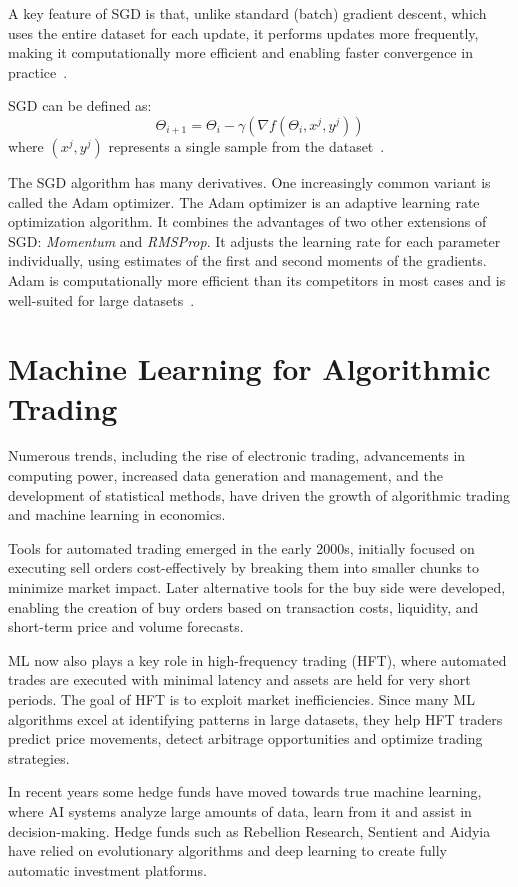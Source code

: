 \documentclass[a4paper,oneside,onecolumn,12pt]{book}
\begin{document}
		A key feature of SGD is that, unlike standard (batch) gradient descent, which uses the entire dataset for each update, it performs updates more frequently, making it computationally more efficient and enabling faster convergence in practice~\cite{COOTMLT}.

		SGD can be defined as:
		\[ \Theta_{i+1} = \Theta_{i} - \gamma (\nabla f(\Theta_i, x^j, y^j)) \]
		where $(x^j, y^j)$ represents a single sample from the dataset~\cite{SGD}.

		The SGD algorithm has many derivatives. One increasingly common variant is called the Adam optimizer. The Adam optimizer is an adaptive learning rate optimization algorithm. It combines the advantages of two other extensions of SGD: \textit{Momentum} and \textit{RMSProp}. It adjusts the learning rate for each parameter individually, using estimates of the first and second moments of the gradients. Adam is computationally more efficient than its competitors in most cases and is well-suited for large datasets~\cite{AO}.

\section{Machine Learning for Algorithmic Trading}
	Numerous trends, including the rise of electronic trading, advancements in computing power, increased data generation and management, and the development of statistical methods, have driven the growth of algorithmic trading and machine learning in economics.

	Tools for automated trading emerged in the early 2000s, initially focused on executing sell orders cost-effectively by breaking them into smaller chunks to minimize market impact. Later alternative tools for the buy side were developed, enabling the creation of buy orders based on transaction costs, liquidity, and short-term price and volume forecasts.

	ML now also plays a key role in high-frequency trading (HFT), where automated trades are executed with minimal latency and assets are held for very short periods. The goal of HFT is to exploit market inefficiencies. Since many ML algorithms excel at identifying patterns in large datasets, they help HFT traders predict price movements, detect arbitrage opportunities and optimize trading strategies.

	In recent years some hedge funds have moved towards true machine learning, where AI systems analyze large amounts of data, learn from it and assist in decision-making. Hedge funds such as Rebellion Research, Sentient and Aidyia have relied on evolutionary algorithms and deep learning to create fully automatic investment platforms.
\end{document}
